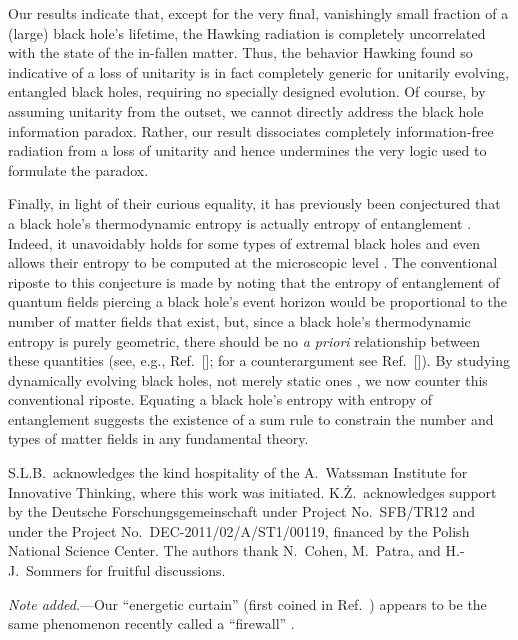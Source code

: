 \documentclass[aps,showpacs,prl,12pt]{revtex4}
\begin{document}
Our results indicate that, except for the very final, vanishingly
small fraction of a (large) black hole's lifetime, the Hawking
radiation is completely uncorrelated with the state of the in-fallen
matter. Thus, the behavior Hawking found so indicative of a loss
of unitarity is in fact completely generic for unitarily evolving,
entangled black holes, requiring no specially designed evolution. 
Of course, by assuming unitarity from the outset, we cannot directly
address the black hole information paradox. Rather, our result
dissociates completely information-free radiation from a loss of
unitarity and hence undermines the very logic used to formulate the
paradox. 

Finally, in light of their curious equality, it has previously been 
conjectured that a black hole's thermodynamic entropy is actually 
entropy of entanglement \cite{tHooft85,Hawking01,Brustein06,Emparan06}.
Indeed, it unavoidably holds for some types of extremal black
holes \cite{Hawking01,Brustein06} and even 
allows their entropy to be computed at the microscopic level 
\cite{Emparan06}. The conventional riposte to this conjecture
is made by noting that the entropy of entanglement of quantum fields
piercing a black hole's event horizon would be proportional
to the number of matter fields that exist, but, since a black hole's
thermodynamic entropy is purely geometric, there should be no
{\it a priori\/} relationship between these quantities (see, e.g.,
Ref.~[]; for a counterargument see
Ref.~[]). By studying dynamically evolving black holes,
not merely static ones \cite{tHooft85,Hawking01,Brustein06,Emparan06},
we now counter this conventional riposte. Equating a black hole's
entropy with entropy of entanglement suggests the existence of a sum
rule to constrain the number and types of matter fields in any
fundamental theory.

S.L.B.\ acknowledges the kind hospitality of the A.\ Watssman Institute
for Innovative Thinking, where this work was initiated.  
K.{\.Z}.\ acknowledges support by the Deutsche
Forschungsgemeinschaft under Project No.\ SFB/TR12 and
under the Project No.\  DEC-2011/02/A/ST1/00119,
financed by the Polish National Science Center.
%
The authors thank N.\ Cohen,
M.\ Patra, and H.-J.\ Sommers for fruitful discussions.

%
\vskip 0.1in
{\it Note added}.---Our ``energetic curtain'' (first coined in
Ref.\ \cite{SLB2009}) appears to be the same phenomenon recently
called a ``firewall'' \cite{firewall}.
\end{document}
